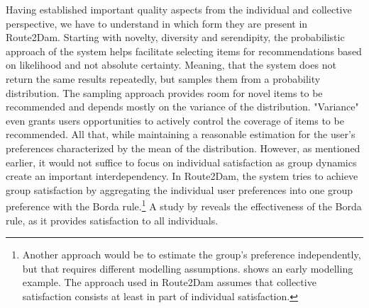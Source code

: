 \documentclass[11pt,a4paper,oneside]{article}
\begin{document}
Having established important quality aspects from the individual and collective perspective, we have to understand in which form they are present in Route2Dam. Starting with novelty, diversity and serendipity, the probabilistic approach of the system helps facilitate selecting items for recommendations based on likelihood and not absolute certainty. Meaning, that the system does not return the same results repeatedly, but samples them from a probability distribution. The sampling approach provides room for novel items to be recommended and depends mostly on the variance of the distribution. "Variance" even grants users opportunities to actively control the coverage of items to be recommended. All that, while maintaining a reasonable estimation for the user's preferences characterized by the mean of the distribution. However, as mentioned earlier, it would not suffice to focus on individual satisfaction as group dynamics create an important interdependency.\cite{masthoff_GroupRecommenderSystems_2015} In Route2Dam, the system tries to achieve group satisfaction by aggregating the individual user preferences into one group preference with the Borda rule.\footnote{Another approach would be to estimate the group's preference independently, but that requires different modelling assumptions. \citeauthor{olaniran_ModelGroupSatisfaction_1996} shows an early modelling example. \cite{olaniran_ModelGroupSatisfaction_1996} The approach used in Route2Dam assumes that collective satisfaction consists at least in part of individual satisfaction.} A study by \citeauthor{masthoff_GroupModelingSelecting_2004} reveals the effectiveness of the Borda rule, as it provides satisfaction to all individuals.\cite{masthoff_GroupModelingSelecting_2004}
\end{document}
